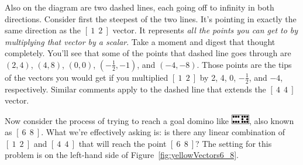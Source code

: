 Also on the diagram are two dashed lines, each going off to infinity in both
directions. Consider first the steepest of the two lines. It's pointing in
exactly the same direction as the $[\ 1\ \ 2\ ]$ vector. It represents
\textit{all the points you can get to by multiplying that vector by a scalar}.
Take a moment and digest that thought completely. You'll see that some of the
points that dashed line goes through are $(2,4)$, $(4,8)$, $(0,0)$,
$(-\frac{1}{2},-1)$, and $(-4,-8)$. Those points are the tips of the vectors
you would get if you multiplied $[\ 1\ \ 2\ ]$ by 2, 4, 0, $-\frac{1}{2}$, and
$-4$, respectively. Similar comments apply to the dashed line that extends the
$[\ 4\ \ 4\ ]$ vector.

Now consider the process of trying to reach a goal domino like
\includegraphics[width=0.06\textwidth]{white6_8.png}, also known as $[\ 6\ \ 8\
]$. What we're effectively asking is: is there any linear combination of $[\ 1\
\ 2\ ]$ and $[\ 4\ \ 4\ ]$ that will reach the point $[\ 6\ \ 8\ ]$? The
setting for this problem is on the left-hand side of 
Figure~\ref{fig:yellowVectors6_8}.

